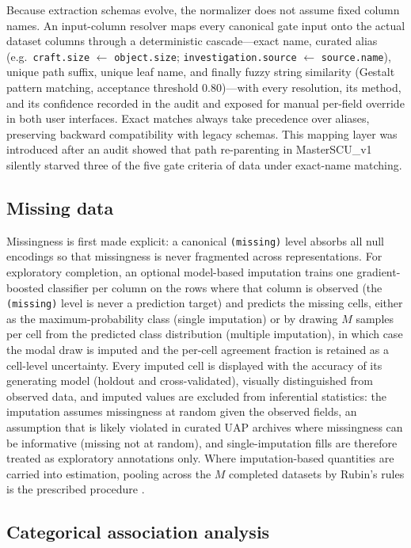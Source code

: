\documentclass[11pt,a4paper]{article}
\newcommand{\field}[1]{\texttt{#1}}
\begin{document}
Because extraction schemas evolve, the normalizer does not assume fixed column names.
An input-column resolver maps every canonical gate input onto the actual dataset
columns through a deterministic cascade---exact name, curated alias (e.g.\
\field{craft.size} $\leftarrow$ \field{object.size}; \field{investigation.source}
$\leftarrow$ \field{source.name}), unique path suffix, unique leaf name, and finally
fuzzy string similarity (Gestalt pattern matching, acceptance threshold 0.80)---with
every resolution, its method, and its confidence recorded in the audit and exposed for
manual per-field override in both user interfaces. Exact matches always take precedence
over aliases, preserving backward compatibility with legacy schemas. This mapping layer
was introduced after an audit showed that path re-parenting in MasterSCU\_v1 silently
starved three of the five gate criteria of data under exact-name matching.

\subsection{Missing data}

Missingness is first made explicit: a canonical \texttt{(missing)} level absorbs all
null encodings so that missingness is never fragmented across representations.
For exploratory completion, an optional model-based imputation trains one gradient-boosted
classifier per column on the rows where that column is observed (the \texttt{(missing)}
level is never a prediction target) and predicts the missing cells, either as the
maximum-probability class (single imputation) or by drawing $M$ samples per cell from
the predicted class distribution (multiple imputation), in which case the modal draw is
imputed and the per-cell agreement fraction is retained as a cell-level uncertainty.
Every imputed cell is displayed with the accuracy of its generating model (holdout and
cross-validated), visually distinguished from observed data, and imputed values are
excluded from inferential statistics: the imputation assumes missingness at random given
the observed fields, an assumption that is likely violated in curated UAP archives where
missingness can be informative (missing not at random), and single-imputation fills are
therefore treated as exploratory annotations only. Where imputation-based quantities are
carried into estimation, pooling across the $M$ completed datasets by Rubin's rules is
the prescribed procedure \cite{rubin1987}.

\subsection{Categorical association analysis}
\end{document}
